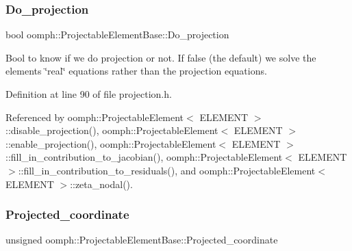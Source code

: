 \mbox{\label{classoomph_1_1ProjectableElementBase_a8e6db97455edb38611347e258593f592}} 
\subsubsection{\texorpdfstring{Do\+\_\+projection}{Do\_projection}}
{\footnotesize\ttfamily bool oomph\+::\+Projectable\+Element\+Base\+::\+Do\+\_\+projection\hspace{0.3cm}{\ttfamily [protected]}}



Bool to know if we do projection or not. If false (the default) we solve the element\textquotesingle{}s \char`\"{}real\char`\"{} equations rather than the projection equations. 



Definition at line 90 of file projection.\+h.



Referenced by oomph\+::\+Projectable\+Element$<$ E\+L\+E\+M\+E\+N\+T $>$\+::disable\+\_\+projection(), oomph\+::\+Projectable\+Element$<$ E\+L\+E\+M\+E\+N\+T $>$\+::enable\+\_\+projection(), oomph\+::\+Projectable\+Element$<$ E\+L\+E\+M\+E\+N\+T $>$\+::fill\+\_\+in\+\_\+contribution\+\_\+to\+\_\+jacobian(), oomph\+::\+Projectable\+Element$<$ E\+L\+E\+M\+E\+N\+T $>$\+::fill\+\_\+in\+\_\+contribution\+\_\+to\+\_\+residuals(), and oomph\+::\+Projectable\+Element$<$ E\+L\+E\+M\+E\+N\+T $>$\+::zeta\+\_\+nodal().

\mbox{\label{classoomph_1_1ProjectableElementBase_ab712be6423145fae3c23e444187db0e2}} 
\subsubsection{\texorpdfstring{Projected\+\_\+coordinate}{Projected\_coordinate}}
{\footnotesize\ttfamily unsigned oomph\+::\+Projectable\+Element\+Base\+::\+Projected\+\_\+coordinate\hspace{0.3cm}{\ttfamily [protected]}}



